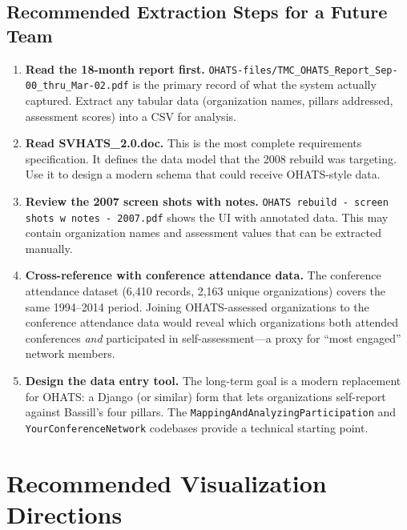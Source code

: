 \documentclass[12pt]{article}
\begin{document}
\subsection{Recommended Extraction Steps for a Future Team}

\begin{enumerate}[leftmargin=1.5em]
  \item \textbf{Read the 18-month report first.}
        \texttt{OHATS-files/TMC\_OHATS\_Report\_Sep-00\_thru\_Mar-02.pdf}
        is the primary record of what the system actually captured. Extract
        any tabular data (organization names, pillars addressed, assessment
        scores) into a CSV for analysis.

  \item \textbf{Read SVHATS\_2.0.doc.}
        This is the most complete requirements specification. It defines
        the data model that the 2008 rebuild was targeting. Use it to design
        a modern schema that could receive OHATS-style data.

  \item \textbf{Review the 2007 screen shots with notes.}
        \texttt{OHATS rebuild - screen shots w notes - 2007.pdf} shows the
        UI with annotated data. This may contain organization names and
        assessment values that can be extracted manually.

  \item \textbf{Cross-reference with conference attendance data.}
        The conference attendance dataset (6,410 records, 2,163 unique
        organizations) covers the same 1994--2014 period. Joining
        OHATS-assessed organizations to the conference attendance data
        would reveal which organizations both attended conferences
        \emph{and} participated in self-assessment---a proxy for
        ``most engaged'' network members.

  \item \textbf{Design the data entry tool.}
        The long-term goal is a modern replacement for OHATS: a Django
        (or similar) form that lets organizations self-report against
        Bassill's four pillars. The \texttt{MappingAndAnalyzingParticipation}
        and \texttt{YourConferenceNetwork} codebases provide a technical
        starting point.
\end{enumerate}

\section{Recommended Visualization Directions}
\end{document}
